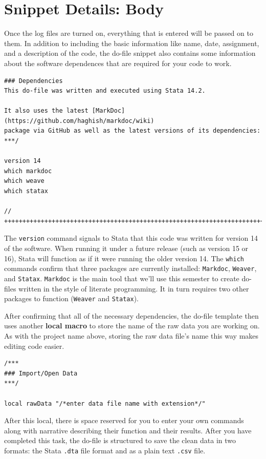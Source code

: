 \documentclass[]{book}
\begin{document}
\section{Snippet Details: Body}\label{snippet-details-body}

Once the log files are turned on, everything that is entered will be
passed on to them. In addition to including the basic information like
name, date, assignment, and a description of the code, the do-file
snippet also contains some information about the software dependences
that are required for your code to work.

\begin{verbatim}
### Dependencies
This do-file was written and executed using Stata 14.2.

It also uses the latest [MarkDoc](https://github.com/haghish/markdoc/wiki)
package via GitHub as well as the latest versions of its dependencies:
***/

version 14
which markdoc
which weave
which statax

// ++++++++++++++++++++++++++++++++++++++++++++++++++++++++++++++++++++++++++
\end{verbatim}

The \texttt{version} command signals to Stata that this code was written
for version 14 of the software. When running it under a future release
(such as version 15 or 16), Stata will function as if it were running
the older version 14. The \texttt{which} commands confirm that three
packages are currently installed: \texttt{Markdoc}, \texttt{Weaver}, and
\texttt{Statax}. \texttt{Markdoc} is the main tool that we'll use this
semester to create do-files written in the style of literate
programming. It in turn requires two other packages to function
(\texttt{Weaver} and \texttt{Statax}).

After confirming that all of the necessary dependencies, the do-file
template then uses another \textbf{local macro} to store the name of the
raw data you are working on. As with the project name above, storing the
raw data file's name this way makes editing code easier.

\begin{verbatim}
/***
### Import/Open Data
***/

local rawData "/*enter data file name with extension*/"
\end{verbatim}

After this local, there is space reserved for you to enter your own
commands along with narrative describing their function and their
results. After you have completed this task, the do-file is structured
to save the clean data in two formats: the Stata \texttt{.dta} file
format and as a plain text \texttt{.csv} file.
\end{document}

